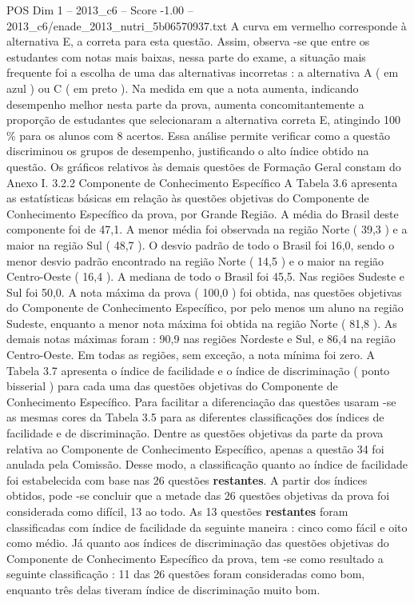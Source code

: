 \begin{textsample}{POS Dim 1 – 2013\_c6 – Score -1.00 – 2013\_c6/enade\_2013\_nutri\_5b06570937.txt}
A curva em vermelho corresponde à alternativa E, a correta para esta questão.
Assim, observa -se que entre os estudantes com notas mais baixas, nessa parte do exame, a situação mais frequente foi a escolha de uma das alternativas incorretas : a alternativa A ( em azul ) ou C ( em preto ).
Na medida em que a nota aumenta, indicando desempenho melhor nesta parte da prova, aumenta concomitantemente a proporção de estudantes que selecionaram a alternativa correta E, atingindo 100 \% para os alunos com 8 acertos.
Essa análise permite verificar como a questão discriminou os grupos de desempenho, justificando o alto índice obtido na questão.
Os gráficos relativos às demais questões de Formação Geral constam do Anexo I. 3.2.2 Componente de Conhecimento Específico A Tabela 3.6 apresenta as estatísticas básicas em relação às questões objetivas do Componente de Conhecimento Específico da prova, por Grande Região.
A média do Brasil deste componente foi de 47,1.
A menor média foi observada na região Norte ( 39,3 ) e a maior na região Sul ( 48,7 ).
O desvio padrão de todo o Brasil foi 16,0, sendo o menor desvio padrão encontrado na região Norte ( 14,5 ) e o maior na região Centro-Oeste ( 16,4 ).
A mediana de todo o Brasil foi 45,5.
Nas regiões Sudeste e Sul foi 50,0.
A nota máxima da prova ( 100,0 ) foi obtida, nas questões objetivas do Componente de Conhecimento Específico, por pelo menos um aluno na região Sudeste, enquanto a menor nota máxima foi obtida na região Norte ( 81,8 ).
As demais notas máximas foram : 90,9 nas regiões Nordeste e Sul, e 86,4 na região Centro-Oeste.
Em todas as regiões, sem exceção, a nota mínima foi zero.
A Tabela 3.7 apresenta o índice de facilidade e o índice de discriminação ( ponto bisserial ) para cada uma das questões objetivas do Componente de Conhecimento Específico.
Para facilitar a diferenciação das questões usaram -se as mesmas cores da Tabela 3.5 para as diferentes classificações dos índices de facilidade e de discriminação.
Dentre as questões objetivas da parte da prova relativa ao Componente de Conhecimento Específico, apenas a questão 34 foi anulada pela Comissão.
Desse modo, a classificação quanto ao índice de facilidade foi estabelecida com base nas 26 questões \textbf{restantes}.
A partir dos índices obtidos, pode -se concluir que a metade das 26 questões objetivas da prova foi considerada como difícil, 13 ao todo.
As 13 questões \textbf{restantes} foram classificadas com índice de facilidade da seguinte maneira : cinco como fácil e oito como médio.
Já quanto aos índices de discriminação das questões objetivas do Componente de Conhecimento Específico da prova, tem -se como resultado a seguinte classificação : 11 das 26 questões foram consideradas como bom, enquanto três delas tiveram índice de discriminação muito bom.

\end{textsample}
